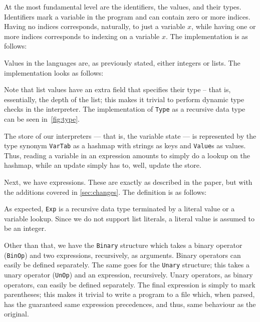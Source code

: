 At the most fundamental level are the identifiers, the values, and their types. Identifiers mark a variable in the program and can contain zero or more indices. Having no indices corresponds, naturally, to just a variable $x$, while having one or more indices corresponds to indexing on a variable $x$. The implementation is as follows:

Values in the languages are, as previously stated, either integers or lists. The implementation looks as follows:

Note that list values have an extra field that specifies their type -- that is, essentially, the depth of the list; this makes it trivial to perform dynamic type checks in the interpreter. The implementation of \texttt{Type} as a recursive data type can be seen in~\ref{fig:type}.

The store of our interpreters --- that is, the variable state --- is represented by the type synonym \texttt{VarTab} as a hashmap with strings as keys and \texttt{Value}s as values. Thus, reading a variable in an expression amounts to simply do a lookup on the hashmap, while an update simply has to, well, update the store.

Next, we have expressions. These are exactly as described in the paper, but with the additions covered in \ref{sec:changes}. The definition is as follows:

As expected, \texttt{Exp} is a recursive data type terminated by a literal value or a variable lookup. Since we do not support list literals, a literal value is assumed to be an integer.


Other than that, we have the \texttt{Binary} structure which takes a binary operator (\texttt{BinOp}) and two expressions, recursively, as arguments. Binary operators can easily be defined separately. The same goes for the \texttt{Unary} structure; this takes a unary operator (\texttt{UnOp}) and an expression, recursively. Unary operators, as binary operators, can easily be defined separately. The final expression is simply to mark parentheses; this makes it trivial to write a program to a file which, when parsed, has the guaranteed same expression precedences, and thus, same behaviour as the original.


